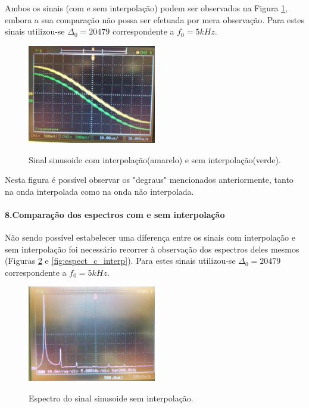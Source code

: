 \documentclass[11pt]{article}
\numberwithin{equation}{section}
\begin{document}
Ambos os sinais (com e sem interpolação) podem ser observados na Figura \ref{fig:interp}, embora a sua comparação não possa ser efetuada por mera observação. Para estes sinais utilizou-se $\Delta_0=20479$ correspondente a $f_0=5kHz$.              
\begin{figure}[H]
	\centering                                          
	\includegraphics[width=0.5\textwidth]{./P1_interp}~\\
	\caption{Sinal sinusoide com interpolação(amarelo) e sem interpolação(verde).}
	\label{fig:interp}
\end{figure}

Nesta figura é possível observar os "degraus" mencionados anteriormente, tanto na onda interpolada como na onda não interpolada.
\paragraph{8.Comparação dos espectros com e sem interpolação} \hspace{0pt} \label{para:P1-8}

Não sendo possível estabelecer uma diferença entre os sinais com interpolação e sem interpolação foi necessário recorrer à observação dos espectros deles mesmos (Figuras \ref{fig:espect_s_interp} e \ref{fig:espect_c_interp}). Para estes sinais utilizou-se $\Delta_0=20479$ correspondente a $f_0=5kHz$.
\begin{figure}[H]
	\centering
	\includegraphics[width=0.5\textwidth]{./P1-8_espect_s_interp}~\\
	\caption{Espectro do sinal sinusoide sem interpolação.}
	\label{fig:espect_s_interp}
\end{figure}
\end{document}
